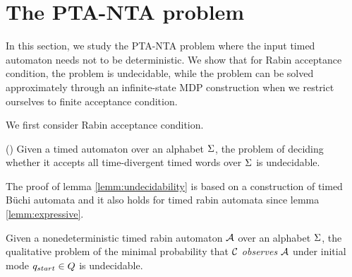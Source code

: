 \section{The PTA-NTA problem}
In this section, we study the PTA-NTA problem where the input timed automaton needs not to be deterministic. 
We show that for Rabin acceptance condition, the problem is undecidable, while the problem can be solved approximately through an infinite-state MDP construction when we restrict ourselves to finite acceptance condition.

We first consider Rabin acceptance condition. 
%
%
\begin{lemma}{(\cite[Theorem 5.2.]{DBLP:conf/tapsoft/Vaandrager97})}\label{lemm:undecidability}
Given a timed automaton over an alphabet $\Sigma$, the problem of deciding whether it accepts all time-divergent timed words over $\Sigma$ is undecidable.
\end{lemma}
%
The proof of lemma \ref{lemm:undecidability} is based on a construction of timed B\"uchi automata and it also holds for timed rabin
automata since lemma \ref{lemm:expressive}.
%
\begin{proposition}
Given a nonedeterministic timed rabin automaton $\mathcal{A}$ over an alphabet $\Sigma$, the qualitative problem of
the minimal probability that $\mathcal{C}$ \emph{observes} $\mathcal{A}$ under initial mode
$q_{start} \in Q$ is undecidable.
\end{proposition}
%
